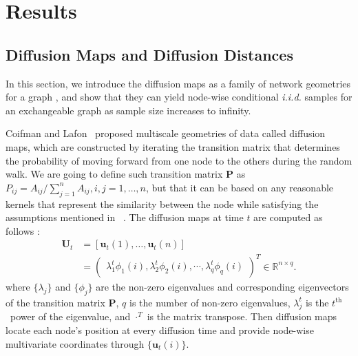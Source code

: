 \documentclass[11pt]{article}
\theoremstyle{definition}
\begin{document}
	\vspace*{-0.2cm}
\section{Results}
\label{sec:method}
	\vspace*{-0.2cm}
\subsection{Diffusion Maps and Diffusion Distances}
\label{ssec:method2}

In this section, we introduce the diffusion maps as a family of network geometries for a graph \cite{coifman2006diffusion}, and show that they can yield node-wise conditional \textit{i.i.d.} samples for an exchangeable graph as sample size increases to infinity.

Coifman and Lafon~\cite{coifman2006diffusion,lafon2006diffusion} proposed multiscale geometries of data called diffusion maps, which are constructed by iterating the transition matrix that determines the probability of moving forward from one node to the others during the random walk.  We are going to define such transition matrix $\mathbf{P}$ as $P_{ij} = A_{ij} / \sum\limits_{j=1}^{n} A_{ij}, i,j=1,\ldots,n$, but that it can be based on any reasonable kernels that represent the similarity between the node while satisfying the assumptions mentioned in ~\cite{coifman2006diffusion}. The diffusion maps at time $t$ are computed as follows : 
	\begin{align*}
	\mathbf{U}_{t} &=[ \mathbf{u}_{t}(1) , \ldots, \mathbf{u}_{t}(n) ]\\
    &= \begin{pmatrix} \lambda^{t}_{1} \phi_{1}(i), \lambda^{t}_{2} \phi_{2} (i), \cdots, \lambda^{t}_{q} \phi_{q}(i) \end{pmatrix}^{T} \in \mathbb{R}^{n \times q}.
	\end{align*}
where $\{ \lambda_{j} \}$ and $\{ \phi_{j}  \}$ are the non-zero eigenvalues and corresponding eigenvectors of the transition matrix $\mathbf{P}$, $q$ is the number of non-zero eigenvalues, $\lambda^{t}_{j}$ is the $t^{\mbox{th}}$~power of the eigenvalue, and ${\cdot}^{T}$ is the matrix transpose. Then diffusion maps locate each node's position at every diffusion time and provide node-wise multivariate coordinates through $\{\mathbf{u}_{t}(i)\}$.   
\end{document}
